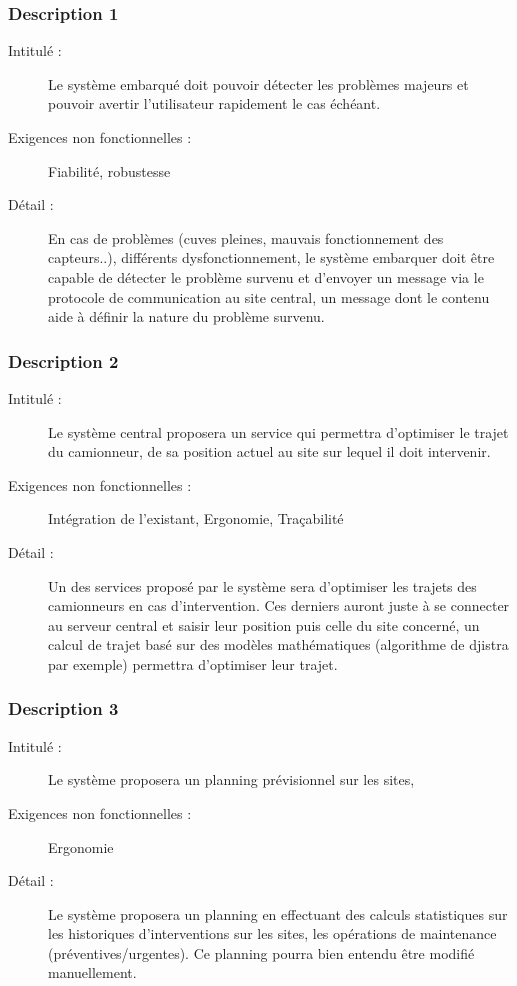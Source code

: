  \subsubsection {Description 1}
\begin{description}
           \item[Intitulé :] Le système embarqué doit pouvoir détecter les problèmes majeurs et pouvoir avertir l'utilisateur rapidement le cas
échéant.
           \item[Exigences non fonctionnelles :] Fiabilité, robustesse
           \item[Détail :] En cas de problèmes (cuves pleines, mauvais fonctionnement des capteurs..), différents dysfonctionnement,
le système embarquer doit être capable de détecter le problème survenu et d'envoyer un message via le protocole de communication au site central, un message dont le contenu aide à définir la nature du problème survenu.
\end{description}

 \subsubsection {Description 2}
\begin{description}
           \item[Intitulé :] Le système central proposera un service qui permettra d'optimiser le trajet du camionneur, de sa position
actuel au site sur lequel il doit intervenir.
           \item[Exigences non fonctionnelles :] Intégration de l'existant, Ergonomie, Traçabilité
           \item[Détail :] Un des services proposé par le système sera d'optimiser les trajets des camionneurs en cas d'intervention.
Ces derniers auront juste à se connecter au serveur central et saisir leur position puis celle du site concerné,
un calcul de trajet basé sur des modèles mathématiques (algorithme de djistra par exemple) permettra d'optimiser 
leur trajet.
\end{description}

 \subsubsection {Description 3}
\begin{description}
           \item[Intitulé :] Le système proposera un planning prévisionnel sur les sites,
           \item[Exigences non fonctionnelles :] Ergonomie
           \item[Détail :] Le système proposera un planning en effectuant des calculs statistiques sur les historiques d'interventions sur les sites, 
les opérations de maintenance (préventives/urgentes). Ce planning pourra bien entendu être modifié manuellement.
\end{description}


